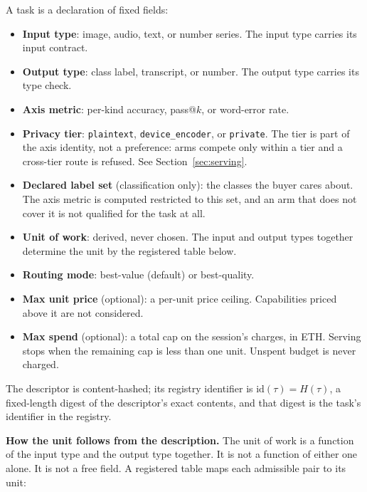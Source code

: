 \documentclass[11pt]{article}
\begin{document}
A task is a declaration of fixed fields:
\begin{itemize}
    \item \textbf{Input type}: image, audio, text, or number series.
          The input type carries its input contract.
    \item \textbf{Output type}: class label, transcript, or number.
          The output type carries its type check.
    \item \textbf{Axis metric}: per-kind accuracy, pass@$k$, or
          word-error rate.
    \item \textbf{Privacy tier}: \texttt{plaintext},
          \texttt{device\_encoder}, or \texttt{private}. The tier is part of
          the axis identity, not a preference: arms compete only within a
          tier and a cross-tier route is refused. See
          Section~\ref{sec:serving}.
    \item \textbf{Declared label set} (classification only): the
          classes the buyer cares about. The axis metric is computed
          restricted to this set, and an arm that does not cover it is not
          qualified for the task at all.
    \item \textbf{Unit of work}: derived, never chosen. The input and
          output types together determine the unit by the registered table
          below.
    \item \textbf{Routing mode}: best-value (default) or
          best-quality.
    \item \textbf{Max unit price} (optional): a per-unit price
          ceiling. Capabilities priced above it are not considered.
    \item \textbf{Max spend} (optional): a total cap on the session's
          charges, in ETH. Serving stops when the remaining cap is less
          than one unit. Unspent budget is never charged.
\end{itemize}
The descriptor is content-hashed; its registry identifier is
$\mathrm{id}(\tau) = H(\tau)$, a fixed-length digest of the
descriptor's exact contents, and that digest is the task's
identifier in the registry.

\textbf{How the unit follows from the description.} The unit of
work is a function of the input type and the output type
together. It is not a function of either one alone. It is not a
free field. A registered table maps each admissible pair to its
unit:
\end{document}
